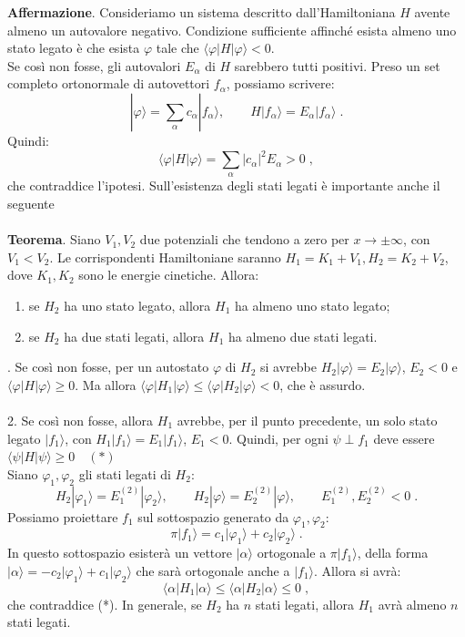 \documentclass[12pt,a4paper]{report}
\theoremstyle{definition}
\numberwithin{equation}{section}
\newcommand{\bra}{\langle}
\newcommand{\ket}{\rangle}
\begin{document}
\textbf{Affermazione}. Consideriamo un sistema descritto dall'Hamiltoniana $H$ avente almeno un autovalore negativo. Condizione sufficiente affinché esista almeno uno stato legato è che esista $\varphi$ tale che $\bra\varphi|H|\varphi\ket<0$. \\
\proof
Se così non fosse, gli autovalori $E_{\alpha}$ di $H$ sarebbero tutti positivi. Preso un set completo ortonormale di autovettori $f_{\alpha}$, possiamo scrivere:
$$
|\varphi\ket=\sum_{\alpha} c_{\alpha}|f_{\alpha}\ket,\qquad H|f_{\alpha}\ket=E_{\alpha}|f_{\alpha}\ket\;.
$$
Quindi:
$$
\bra\varphi|H|\varphi\ket=\sum_{\alpha} |c_{\alpha}|^2 E_{\alpha}>0\;,
$$
che contraddice l'ipotesi.
\endproof
Sull'esistenza degli stati legati è importante anche il seguente \\
\\
\textbf{Teorema}. Siano $V_1,V_2$ due potenziali che tendono a zero per $x\to\pm\infty$, con $V_1<V_2$. Le corrispondenti Hamiltoniane saranno $H_1=K_1+V_1, H_2=K_2+V_2$, dove $K_1,K_2$ sono le energie cinetiche. Allora:
\begin{enumerate}
\item se $H_2$ ha uno stato legato, allora $H_1$ ha almeno uno stato legato;
\item se $H_2$ ha due stati legati, allora $H_1$ ha almeno due stati legati.
\end{enumerate}
. Se così non fosse, per un autostato $\varphi$ di $H_2$ si avrebbe $H_2|\varphi\ket=E_2|\varphi\ket$, $E_2<0$ e $\bra\varphi|H|\varphi\ket\ge 0$. Ma allora $\bra\varphi|H_1|\varphi\ket\le\bra\varphi|H_2|\varphi\ket<0$, che è assurdo.\\
\\
2. Se così non fosse, allora $H_1$ avrebbe, per il punto precedente, un solo stato legato $|f_1\ket$, con $H_1|f_1\ket=E_1|f_1\ket$, $E_1<0$. Quindi, per ogni $\psi\perp f_1$ deve essere $\bra\psi|H|\psi\ket\ge 0 \quad (*)$ \\
Siano $\varphi_1,\varphi_2$ gli stati legati di $H_2$:
$$
H_2|\varphi_1\ket=E_1^{(2)}|\varphi_2\ket,\qquad H_2|\varphi\ket=E_2^{(2)}|\varphi\ket,\qquad E_1^{(2)},E_2^{(2)}<0\;.
$$
Possiamo proiettare $f_1$ sul sottospazio generato da $\varphi_1,\varphi_2$:
$$
\pi|f_1\ket=c_1|\varphi_1\ket+c_2|\varphi_2\ket\;.
$$
In questo sottospazio esisterà un vettore $|\alpha\ket$ ortogonale a $\pi|f_1\ket$, della forma $|\alpha\ket=-c_2|\varphi_1\ket+c_1|\varphi_2\ket$ che sarà ortogonale anche a $|f_1\ket$. Allora si avrà:
$$
\bra \alpha|H_1|\alpha\ket\le \bra\alpha|H_2|\alpha\ket\le 0\;,
$$
che contraddice (*).
\endproof
In generale, se $H_2$ ha $n$ stati legati, allora $H_1$ avrà almeno $n$ stati legati.
\end{document}
